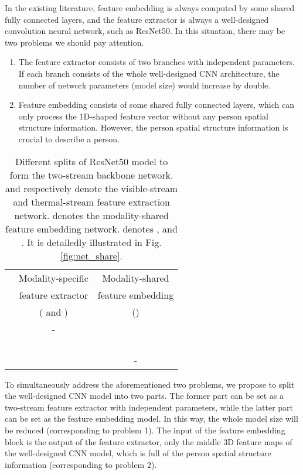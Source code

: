 \documentclass[journal]{IEEEtran}
\begin{document}
In the existing literature, feature embedding is always computed by some shared fully connected layers, and the feature extractor is always a well-designed convolution neural network, such as ResNet50. In this situation, there may be two problems we should pay attention.
\begin{enumerate}
\item The feature extractor consists of two branches with independent parameters. If each branch consists of the whole well-designed CNN architecture, the number of network parameters (model size) would increase by double.
\item Feature embedding consists of some shared fully connected layers, which can only process the 1D-shaped feature vector without any person spatial structure information. However, the person spatial structure information is crucial to describe a person.
\end{enumerate}

\begin{table}
\caption{Different splits of ResNet50 model to form the two-stream backbone network.  and  respectively denote the visible-stream and thermal-stream feature extraction network.  denotes the modality-shared feature embedding network.  denotes ,  and . It is detailedly illustrated in Fig. \ref{fig:net_share}.}
\label{tab:split_scheme}
  \centering
  \begin{tabular}{l|c|c}
  \toprule[2pt]
       \multirow{3}{*}{} & Modality-specific  & Modality-shared  \\
        & feature extractor & feature embedding \\
       & ( and ) & () \\ \toprule[1pt]
       & - &   \\ \hline
       &  &   \\ \hline
       &  &   \\ \hline
       &  &   \\ \hline
       &  &   \\ \hline
       &  & -  \\
     \toprule[2pt]
  \end{tabular}
\end{table}

To simultaneously address the aforementioned two problems, we propose to split the well-designed CNN model into two parts. The former part can be set as a two-stream feature extractor with independent parameters, while the latter part can be set as the feature embedding model. In this way, the whole model size will be reduced (corresponding to problem 1). The input of the feature embedding block is the output of the feature extractor, only the middle 3D feature maps of the well-designed CNN model, which is full of the person spatial structure information (corresponding to problem 2).
\end{document}
